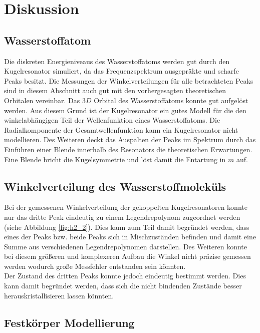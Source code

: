 \section{Diskussion}
\label{sec:diskussion}

\subsection{Wasserstoffatom}

Die diskreten Energieniveaus des Wasserstoffatoms werden gut durch den Kugelresonator simuliert, da das Frequenzspektrum ausgepräkte und scharfe Peaks besitzt. 
Die Messungen der Winkelverteilungen für alle betrachteten Peaks sind in diesem Abschnitt auch gut mit den vorhergesagten theoretischen Orbitalen vereinbar. Das $3D$ Orbital des Wasserstoffatoms konnte gut aufgelöst werden.
Aus diesem Grund ist der Kugelresonator ein gutes Modell für die den winkelabhängigen Teil der Wellenfunktion eines Wasserstoffatoms. Die Radialkomponente der Gesamtwellenfunktion kann ein Kugelresonator nicht modellieren.  
Des Weiteren deckt das Auspalten der Peaks im Spektrum durch das Einführen einer Blende innerhalb des Resonators die theoretischen Erwartungen. Eine Blende bricht die Kugelsymmetrie und löst damit die Entartung in $m$ auf. 
\subsection{Winkelverteilung des Wasserstoffmoleküls}

Bei der gemessenen Winkelverteilung der gekoppelten Kugelresonatoren konnte nur das dritte Peak eindeutig zu einem Legendrepolynom zugeordnet werden (siehe Abbildung \ref{fig:h2_2}). 
Dies kann zum Teil damit begründet werden, dass eines der Peaks bzw. beide Peaks sich in Mischzuständen befinden und damit eine Summe aus verschiedenen Legendrepolynomen darstellen. 
Des Weiteren konnte bei diesem größeren und komplexeren Aufbau die Winkel nicht präzise gemessen werden wodurch große Messfehler entstanden sein könnten. \\
Der Zustand des dritten Peaks konnte jedoch eindeutig bestimmt werden. Dies kann damit begründet werden, dass sich die nicht bindenden Zustände besser herauskristallisieren lassen könnten. 
\subsection{Festkörper Modellierung}

